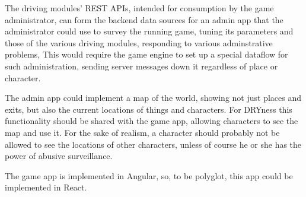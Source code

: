 The driving modules' REST APIs, intended for consumption by the game
administrator, can form the backend data sources for an admin app that
the administrator could use to survey the running game,
tuning its parameters and those of the various driving modules, responding to
various adminstrative problems, \etc
This would require the game engine to set
up a special dataflow for such administration, sending server messages down
it regardless of place or character.

The admin app could implement a map of the world, showing not just places and
exits, but also the current locations of things and characters.
For DRYness this functionality should be shared with the game app, allowing
characters to see the map and use it.
For the sake of realism, a character should probably not be
allowed to see the locations of other characters, unless of course he
or she has the power of abusive surveillance.

The game app is implemented in Angular, so, to be polyglot, this app could be
implemented in React.